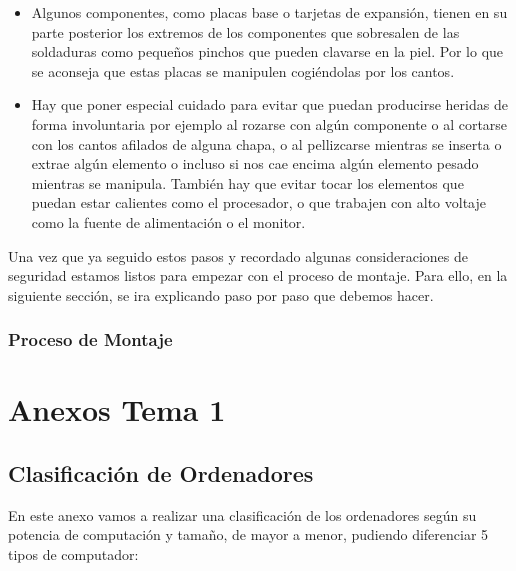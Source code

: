 \begin{enumerate}
\begin{itemize}
        \item Algunos componentes, como placas base o tarjetas de expansión, tienen en su parte posterior los extremos de los componentes que sobresalen de las soldaduras como pequeños pinchos que pueden clavarse en la piel. Por lo que se aconseja que estas placas se manipulen cogiéndolas por los cantos.

        \item Hay que poner especial cuidado para evitar que puedan producirse heridas de forma involuntaria por ejemplo al rozarse con algún componente o al cortarse con los cantos afilados de alguna chapa, o al pellizcarse mientras se inserta o extrae algún elemento o incluso si nos cae encima algún elemento pesado mientras se manipula. También hay que evitar tocar los elementos que puedan estar calientes como el procesador, o que trabajen con alto voltaje como la fuente de alimentación o el monitor.
    \end{itemize}
\end{enumerate}

Una vez que ya seguido estos pasos y recordado algunas consideraciones de seguridad estamos listos para empezar con el proceso de montaje. Para ello, en la siguiente sección, se ira explicando paso por paso que debemos hacer.

\subsection{Proceso de Montaje}






\appendix


\chapter{Anexos Tema 1}

\section{Clasificación de Ordenadores}
En este anexo vamos a realizar una clasificación de los ordenadores según su potencia de computación y tamaño, de mayor a menor, pudiendo diferenciar 5 tipos de computador:

